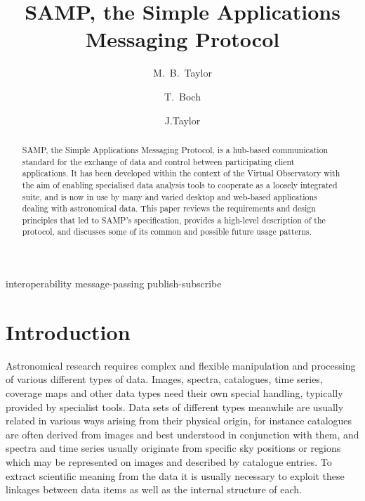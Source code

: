 \documentclass[5p]{elsarticle}
\begin{document}
\begin{frontmatter}

\title{SAMP, the Simple Applications Messaging Protocol}

\author[bristol]{M.~B.~Taylor}
\author[cds]{T.~Boch}
\author[google]{J.Taylor}

\address[bristol]{H.~H.~Wills Physics Laboratory, University of Bristol, UK}
\address[cds]{CDS, Observatoire Astronomique de Strasbourg, France}
\address[google]{Google, USA}

\begin{abstract}
SAMP, the Simple Applications Messaging Protocol, is a
hub-based communication standard for the exchange of data and control
between participating client applications.
It has been developed within the context of the Virtual Observatory
with the aim of enabling specialised data analysis tools to cooperate
as a loosely integrated suite, and is now in use by many and varied
desktop and web-based applications dealing with astronomical data.
This paper reviews the requirements and design principles that led to
SAMP's specification, provides a high-level description of the protocol,
and discusses some of its common and possible future usage patterns.
\end{abstract}

\begin{keyword}
interoperability
message-passing
publish-subscribe
\end{keyword}

\end{frontmatter}

\begin{flushright}
{\tt }
\end{flushright}

\newcommand{\kdot}{.\linebreak[0]}

\section{Introduction}

Astronomical research requires complex and flexible manipulation
and processing of various different types of data.
Images, spectra, catalogues, time series, coverage maps and other data
types need their own special handling,
typically provided by specialist tools.
Data sets of different types meanwhile are usually related
in various ways arising from their physical origin,
for instance
catalogues are often derived from images and best understood in
conjunction with them, and
spectra and time series usually originate from specific sky positions
or regions which may be represented on images and described by
catalogue entries.
To extract scientific meaning from the data it is usually necessary
to exploit these linkages between data items as well as the
internal structure of each.
\end{document}
